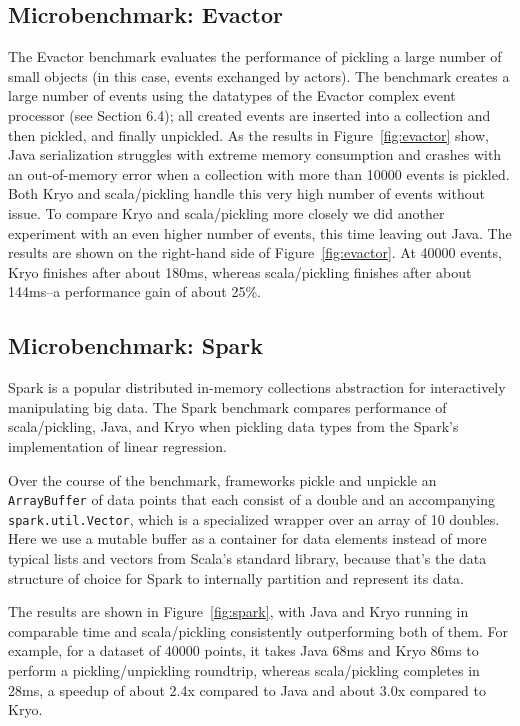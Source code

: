 \documentclass[10pt]{sigplanconf}
\theoremstyle{definition}
\theoremstyle{definition}
\begin{document}
\subsection{Microbenchmark: Evactor}

The Evactor benchmark evaluates the performance of pickling a large number of
small objects (in this case, events exchanged by actors). The benchmark
creates a large number of events using the datatypes of the Evactor complex
event processor  (see Section 6.4); all created events are inserted into a
collection and then pickled, and finally unpickled. As the results in
Figure~\ref{fig:evactor} show, Java serialization struggles with extreme memory
consumption and crashes with an out-of-memory error when a collection with
more than 10000 events is pickled. Both Kryo and scala/pickling handle this
very high number of events without issue. To compare Kryo and scala/pickling
more closely we did another experiment with an even higher number of events,
this time leaving out Java. The results are shown on the right-hand side of
Figure~\ref{fig:evactor}. At 40000 events, Kryo finishes after about 180ms, whereas
scala/pickling finishes after about 144ms--a performance gain of about 25\%.

\subsection{Microbenchmark: Spark}

Spark is a popular distributed in-memory collections abstraction for interactively manipulating big data.
The Spark benchmark compares performance of scala/pickling, Java, and Kryo when pickling data types from the Spark's implementation of linear regression.

Over the course of the benchmark, frameworks pickle and unpickle an
\verb|ArrayBuffer| of data points that each consist of a double
and an accompanying \verb|spark.util.Vector|, which
is a specialized wrapper over an array of 10 doubles. Here we use a
mutable buffer as a container for data elements instead
of more typical lists and vectors from Scala's standard library,
because that's the data structure of choice for Spark
to internally partition and represent its data.

The results are shown in Figure~\ref{fig:spark}, with Java and Kryo
running in comparable time and scala/pickling consistently outperforming both of them. For example, for a dataset of 40000 points, it takes Java 68ms and Kryo 86ms to perform a pickling/unpickling roundtrip, whereas scala/pickling completes in 28ms, a speedup of about 2.4x compared to Java and about 3.0x compared to Kryo.
\end{document}
